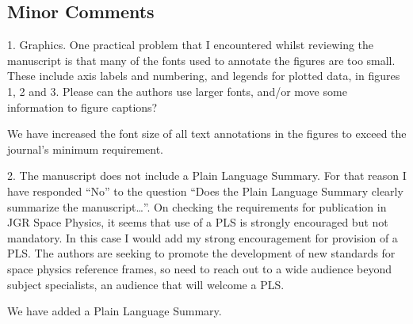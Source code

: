 \documentclass[11pt]{article}
\begin{document}
\subsection{Minor Comments}

1. Graphics. One practical problem that I encountered whilst reviewing the manuscript is that many of the fonts used to annotate the figures are too small. These include axis labels and numbering, and legends for plotted data, in figures 1, 2 and 3. Please can the authors use larger fonts, and/or move some information to figure captions?
\\
{\color{violet}
\begin{leftbar}
We have increased the font size of all text annotations in the figures to exceed the journal's minimum requirement.
\end{leftbar}}

2. The manuscript does not include a Plain Language Summary. For that reason I have responded “No” to the question “Does the Plain Language Summary clearly summarize the manuscript…”. On checking the requirements for publication in JGR Space Physics, it seems that use of a PLS is strongly encouraged but not mandatory. In this case I would add my strong encouragement for provision of a PLS. The authors are seeking to promote the development of new standards for space physics reference frames, so need to reach out to a wide audience beyond subject specialists, an audience that will welcome a PLS.
\\
{\color{violet}
\begin{leftbar}

We have added a Plain Language Summary.
\end{leftbar}
}
\end{document}
